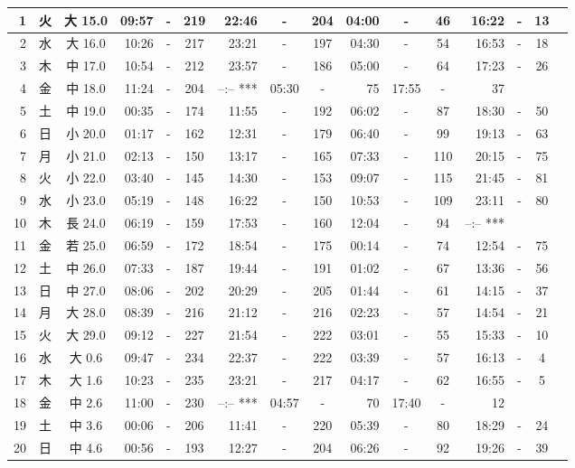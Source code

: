 \documentclass[12pt.a4j]{jsarticle}
\begin{document}
\begin{center}
\begin{table}[ht]
\begin{tabular}{|rc|cr|ccrccr|ccrccr|}
 \hline
 1 & 火 & 大 15.0 & 09:57 &-& 219 & 22:46 &-& 204 & 04:00 &-&  46 & 16:22 &-&  13 \\
\hline
 2 & 水 & 大 16.0 & 10:26 &-& 217 & 23:21 &-& 197 & 04:30 &-&  54 & 16:53 &-&  18 \\
\hline
 3 & 木 & 中 17.0 & 10:54 &-& 212 & 23:57 &-& 186 & 05:00 &-&  64 & 17:23 &-&  26 \\
\hline
 4 & 金 & 中 18.0 & 11:24 &-& 204 & --:--   *** & 05:30 &-&  75 & 17:55 &-&  37 \\
\hline
 5 & 土 & 中 19.0 & 00:35 &-& 174 & 11:55 &-& 192 & 06:02 &-&  87 & 18:30 &-&  50 \\
\hline
 6 & 日 & 小 20.0 & 01:17 &-& 162 & 12:31 &-& 179 & 06:40 &-&  99 & 19:13 &-&  63 \\
\hline
 7 & 月 & 小 21.0 & 02:13 &-& 150 & 13:17 &-& 165 & 07:33 &-& 110 & 20:15 &-&  75 \\
\hline
 8 & 火 & 小 22.0 & 03:40 &-& 145 & 14:30 &-& 153 & 09:07 &-& 115 & 21:45 &-&  81 \\
\hline
 9 & 水 & 小 23.0 & 05:19 &-& 148 & 16:22 &-& 150 & 10:53 &-& 109 & 23:11 &-&  80 \\
\hline
10 & 木 & 長 24.0 & 06:19 &-& 159 & 17:53 &-& 160 & 12:04 &-&  94 & --:--   *** \\
\hline
11 & 金 & 若 25.0 & 06:59 &-& 172 & 18:54 &-& 175 & 00:14 &-&  74 & 12:54 &-&  75 \\
\hline
12 & 土 & 中 26.0 & 07:33 &-& 187 & 19:44 &-& 191 & 01:02 &-&  67 & 13:36 &-&  56 \\
\hline
13 & 日 & 中 27.0 & 08:06 &-& 202 & 20:29 &-& 205 & 01:44 &-&  61 & 14:15 &-&  37 \\
\hline
14 & 月 & 大 28.0 & 08:39 &-& 216 & 21:12 &-& 216 & 02:23 &-&  57 & 14:54 &-&  21 \\
\hline
15 & 火 & 大 29.0 & 09:12 &-& 227 & 21:54 &-& 222 & 03:01 &-&  55 & 15:33 &-&  10 \\
\hline
16 & 水 & 大  0.6 & 09:47 &-& 234 & 22:37 &-& 222 & 03:39 &-&  57 & 16:13 &-&   4 \\
\hline
17 & 木 & 大  1.6 & 10:23 &-& 235 & 23:21 &-& 217 & 04:17 &-&  62 & 16:55 &-&   5 \\
\hline
18 & 金 & 中  2.6 & 11:00 &-& 230 & --:--   *** & 04:57 &-&  70 & 17:40 &-&  12 \\
\hline
19 & 土 & 中  3.6 & 00:06 &-& 206 & 11:41 &-& 220 & 05:39 &-&  80 & 18:29 &-&  24 \\
\hline
20 & 日 & 中  4.6 & 00:56 &-& 193 & 12:27 &-& 204 & 06:26 &-&  92 & 19:26 &-&  39 \\

\end{tabular}
\end{table}
\end{center}
\end{document}
